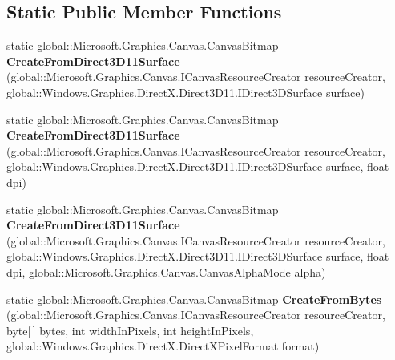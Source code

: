 \subsection*{Static Public Member Functions}
\begin{DoxyCompactItemize}
\item 
\mbox{\label{class_microsoft_1_1_graphics_1_1_canvas_1_1_canvas_bitmap_adb53e7172552d09bc317b5b85c254fff}} 
static global\+::\+Microsoft.\+Graphics.\+Canvas.\+Canvas\+Bitmap {\bfseries Create\+From\+Direct3\+D11\+Surface} (global\+::\+Microsoft.\+Graphics.\+Canvas.\+I\+Canvas\+Resource\+Creator resource\+Creator, global\+::\+Windows.\+Graphics.\+Direct\+X.\+Direct3\+D11.\+I\+Direct3\+D\+Surface surface)
\item 
\mbox{\label{class_microsoft_1_1_graphics_1_1_canvas_1_1_canvas_bitmap_a9bcb0865c8ef9a544991db05907b06ff}} 
static global\+::\+Microsoft.\+Graphics.\+Canvas.\+Canvas\+Bitmap {\bfseries Create\+From\+Direct3\+D11\+Surface} (global\+::\+Microsoft.\+Graphics.\+Canvas.\+I\+Canvas\+Resource\+Creator resource\+Creator, global\+::\+Windows.\+Graphics.\+Direct\+X.\+Direct3\+D11.\+I\+Direct3\+D\+Surface surface, float dpi)
\item 
\mbox{\label{class_microsoft_1_1_graphics_1_1_canvas_1_1_canvas_bitmap_af8889f744c558157dc904b1fd37e99a4}} 
static global\+::\+Microsoft.\+Graphics.\+Canvas.\+Canvas\+Bitmap {\bfseries Create\+From\+Direct3\+D11\+Surface} (global\+::\+Microsoft.\+Graphics.\+Canvas.\+I\+Canvas\+Resource\+Creator resource\+Creator, global\+::\+Windows.\+Graphics.\+Direct\+X.\+Direct3\+D11.\+I\+Direct3\+D\+Surface surface, float dpi, global\+::\+Microsoft.\+Graphics.\+Canvas.\+Canvas\+Alpha\+Mode alpha)
\item 
\mbox{\label{class_microsoft_1_1_graphics_1_1_canvas_1_1_canvas_bitmap_a0348f1385bf9b0fc99f3bd0a55c0ae0a}} 
static global\+::\+Microsoft.\+Graphics.\+Canvas.\+Canvas\+Bitmap {\bfseries Create\+From\+Bytes} (global\+::\+Microsoft.\+Graphics.\+Canvas.\+I\+Canvas\+Resource\+Creator resource\+Creator, byte\mbox{[}$\,$\mbox{]} bytes, int width\+In\+Pixels, int height\+In\+Pixels, global\+::\+Windows.\+Graphics.\+Direct\+X.\+Direct\+X\+Pixel\+Format format)

\end{DoxyCompactItemize}
